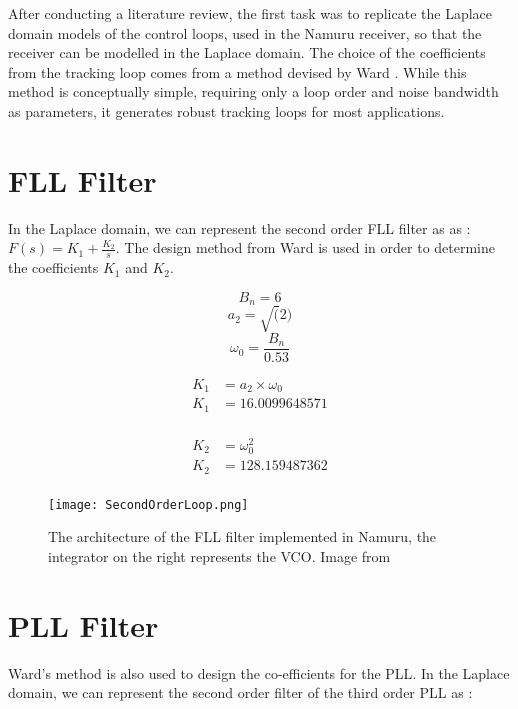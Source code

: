 After conducting a literature review, the first task was to replicate the Laplace domain models of the control loops, used in the Namuru receiver, so that the receiver can be modelled in the Laplace domain. The choice of the coefficients from the tracking loop comes from a method devised by Ward \cite{Ward}. While this method is conceptually simple, requiring only a loop order and noise bandwidth as parameters, it generates robust tracking loops for most applications. 

\section{\ac{FLL} Filter}
In the Laplace domain, we can represent the second order \ac{FLL} filter as as :  $F(s) = K_1 + \frac{K_2}{s}$. The design method from Ward \cite{Ward} is used in order to determine the coefficients $K_1$ and $K_2$.  

$$B_n = 6$$
$$a_2 = \sqrt(2)$$
$$\omega_{0}=\frac{B_n}{0.53}$$

\begin{equation} \label{eq1}
\begin{split}
K_1 & = a_2 \times \omega_{0}\\
K_1 & = 16.0099648571\\
\end{split}
\end{equation}

\begin{equation} \label{eq2}
\begin{split}
K_2 & = \omega_{0}^2\\
K_2 & = 128.159487362\\
\end{split}
\end{equation}

\begin{figure}[!htb] 
    \centering
    \texttt{[image: SecondOrderLoop.png]} 
    \caption{The architecture of the \ac{FLL} filter implemented in Namuru, the integrator on the right represents the \ac{VCO}. Image from \cite{Kaplan}}
    \label{fig:SecondOrderLoop}
\end{figure}


\section{\ac{PLL} Filter}
Ward's method is also used to design the co-efficients for the \ac{PLL}. In the Laplace domain, we can represent the second order filter  of the third order \ac{PLL} as : 

